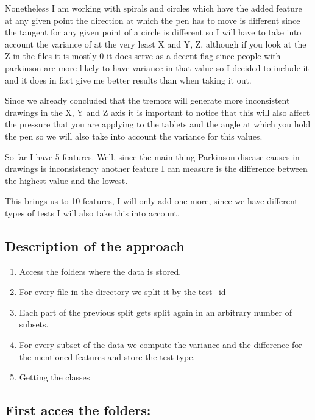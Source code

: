 \documentclass{article} %
\begin{document}
Nonetheless I am working with spirals and circles which have the added feature at any given point the direction at which the pen has to move is different since the tangent for any given point of a circle is different so I will have to take into account the variance of at the very least X and Y, Z, although if you look at the Z in the files it is mostly 0 it does serve as a decent flag since people with parkinson are more likely to have variance in that value so I decided to include it and it does in fact give me better results than when taking it out. 

\bigskip

Since we already concluded that the tremors will generate more inconsistent drawings in the X, Y and Z axis it is important to notice that this will also affect the pressure that you are applying to the tablets and the angle at which you hold the pen so we will also take into account the variance for this values.

So far I have 5 features. Well, since the main thing Parkinson disease causes in drawings is inconsistency another feature I can measure is  the difference between the highest value and the lowest.

This brings us to 10 features, I will only add one more, since we have different types of tests I will also take this into account.

\subsection{Description of the approach}

\begin{enumerate} 
 
  \item Access the folders where the data is stored.
	\item For every file in the directory we split it by the test\_id
	\item Each part of the previous split gets split again in an arbitrary number of subsets.
	\item For every subset of the data we compute the variance and the difference for the mentioned features and store the test type.
	\item Getting the classes
\end{enumerate} 

\subsection*{First acces the folders:}
\end{document}
